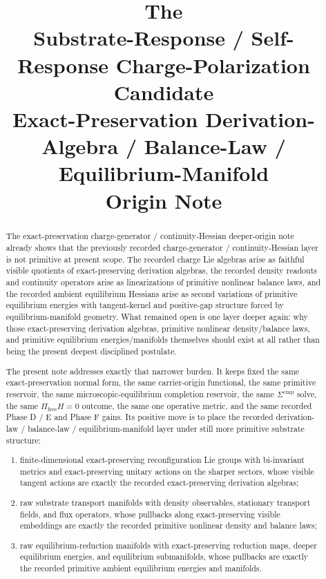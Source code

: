 \documentclass[11pt]{article}
\title{\textbf{The \TheoryName{}}\\[0.4em]
\large Substrate-Response / Self-Response Charge-Polarization Candidate\\
\large Exact-Preservation Derivation-Algebra / Balance-Law / Equilibrium-Manifold\\
\large Origin Note}
\author{}
\date{}
\begin{document}
\maketitle

\begin{abstract}
The exact-preservation charge-generator / continuity-Hessian deeper-origin note already shows that the previously recorded charge-generator / continuity-Hessian layer is not primitive at present scope. The recorded charge Lie algebras arise as faithful visible quotients of exact-preserving derivation algebras, the recorded density readouts and continuity operators arise as linearizations of primitive nonlinear balance laws, and the recorded ambient equilibrium Hessians arise as second variations of primitive equilibrium energies with tangent-kernel and positive-gap structure forced by equilibrium-manifold geometry. What remained open is one layer deeper again: why those exact-preserving derivation algebras, primitive nonlinear density/balance laws, and primitive equilibrium energies/manifolds themselves should exist at all rather than being the present deepest disciplined postulate.

The present note addresses exactly that narrower burden. It keeps fixed the same exact-preservation normal form, the same carrier-origin functional, the same primitive reservoir, the same microscopic-equilibrium completion reservoir, the same \(\Sigma^{\mathrm{cmp}}\) solve, the same \(\Pi_{\mathrm{free}}H=0\) outcome, the same one operative metric, and the same recorded Phase D / E and Phase F gains. Its positive move is to place the recorded derivation-law / balance-law / equilibrium-manifold layer under still more primitive substrate structure:
\begin{enumerate}
    \item finite-dimensional exact-preserving reconfiguration Lie groups with bi-invariant metrics and exact-preserving unitary actions on the sharper sectors, whose visible tangent actions are exactly the recorded exact-preserving derivation algebras;
    \item raw substrate transport manifolds with density observables, stationary transport fields, and flux operators, whose pullbacks along exact-preserving visible embeddings are exactly the recorded primitive nonlinear density and balance laws;
    \item raw equilibrium-reduction manifolds with exact-preserving reduction maps, deeper equilibrium energies, and equilibrium submanifolds, whose pullbacks are exactly the recorded primitive ambient equilibrium energies and manifolds.
\end{enumerate}


\end{abstract}
\end{document}
